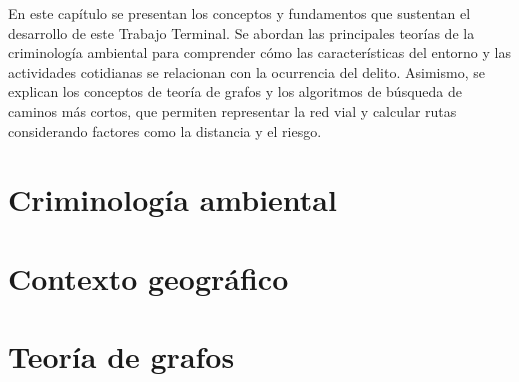 En este capítulo se presentan los conceptos y fundamentos que sustentan el desarrollo de este Trabajo Terminal. Se abordan las principales teorías de la criminología ambiental para comprender cómo las características del entorno y las actividades cotidianas se relacionan con la ocurrencia del delito. Asimismo, se explican los conceptos de teoría de grafos y los algoritmos de búsqueda de caminos más cortos, que permiten representar la red vial y calcular rutas considerando factores como la distancia y el riesgo.
\section{Criminología ambiental}
\label{sec:criminologia_ambiental}


\section{Contexto geográfico}
\label{sec:contexto_geografico}


\newpage
\section{Teoría de grafos}
\label{sec:teoria_grafos}

